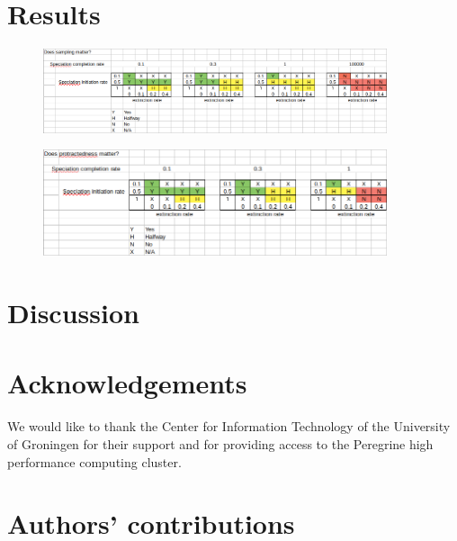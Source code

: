 \documentclass{article}
\begin{document}
\section{Results}

\begin{figure}[]
  \includegraphics[width=0.9\textwidth]{fig_does_sampling_matter.png}
\end{figure}

\begin{figure}[]
  \includegraphics[width=0.9\textwidth]{fig_does_protractedness_matter.png}
\end{figure}

\section{Discussion}


\section{Acknowledgements}

We would like to thank the Center for Information Technology of the University of Groningen for their support
and for providing access to the Peregrine high performance computing cluster.

\section{Authors' contributions}



\end{document}
